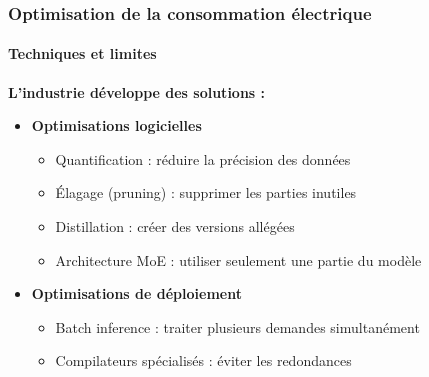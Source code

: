 \begin{frame}
\frametitle{Optimisation de la consommation électrique}
\framesubtitle{Techniques et limites}

\textbf{L'industrie développe des solutions :}

\vspace{0.3cm}

\begin{itemize}
    \item<+-> \textbf{Optimisations logicielles}
        \begin{itemize}
            \item Quantification : réduire la précision des données
            \item Élagage (pruning) : supprimer les parties inutiles
            \item Distillation : créer des versions allégées
            \item Architecture MoE : utiliser seulement une partie du modèle
        \end{itemize}

    \vspace{0.2cm}
    \item<+-> \textbf{Optimisations de déploiement}
        \begin{itemize}
            \item Batch inference : traiter plusieurs demandes simultanément
            \item Compilateurs spécialisés : éviter les redondances
        \end{itemize}
\end{itemize}

\end{frame}


